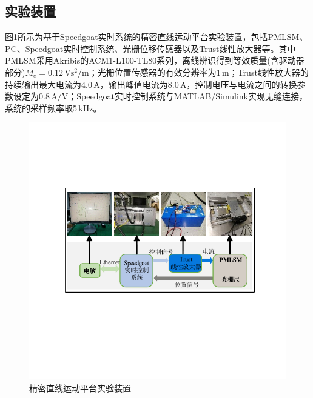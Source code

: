 \subsection{实验装置}
图\ref{精密直线运动平台实验装置}所示为基于Speedgoat实时系统的精密直线运动平台实验装置，包括PMLSM、PC、Speedgoat实时控制系统、光栅位移传感器以及Trust线性放大器等。其中PMLSM采用Akribis的ACM1-L100-TL80系列，离线辨识得到等效质量(含驱动器部分)$M_e=0.12\,\text{V}\text{s}^2/\text{m}$；光栅位置传感器的有效分辨率为1\,\text{$\upmu$}m；Trust线性放大器的持续输出最大电流为$4.0$\,A，输出峰值电流为$8.0$\,A，控制电压与电流之间的转换参数设定为$0.8\,\text{A/V}$；Speedgoat实时控制系统与MATLAB/Simulink实现无缝连接，系统的采样频率取5\,kHz。
\begin{figure}[H]
	\centering
	\includegraphics[width=12cm]{figures/实验装置图.pdf}
	\caption{精密直线运动平台实验装置}
	\label{精密直线运动平台实验装置}
\end{figure}

